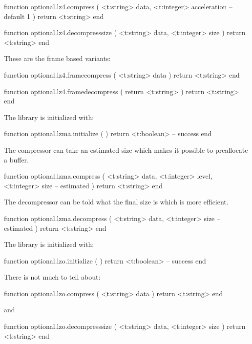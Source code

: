 \starttyping[option=LUA]
function optional.lz4.compress (
    <t:string>  data,
    <t:integer> acceleration -- default 1
)
    return <t:string>
end

function optional.lz4.decompresssize (
    <t:string>  data,
    <t:integer> size
)
    return <t:string>
end
\stoptyping

These are the frame based variants:

\starttyping[option=LUA]
function optional.lz4.framecompress ( <t:string> data )
    return <t:string>
end

function optional.lz4.framedecompress ( return <t:string>  )
    return <t:string>
end
\stoptyping

\stopsubsubsubject

\startsubsubsubject[title=lzma]

The library is initialized with:

\starttyping[option=LUA]
function optional.lzma.initialize ( )
    return <t:boolean> -- success
end
\stoptyping

The compressor can take an estimated size which makes it possible to preallocate
a buffer.

\starttyping[option=LUA]
function optional.lzma.compress (
    <t:string>  data,
    <t:integer> level,
    <t:integer> size   -- estimated
)
    return <t:string>
end
\stoptyping

The decompressor can be told what the final size is which is more efficient.

\starttyping[option=LUA]
function optional.lzma.decompress (
    <t:string>  data,
    <t:integer> size   -- estimated
)
    return <t:string>
end
\stoptyping

\stopsubsubsubject

\startsubsubsubject[title=lzo]

The library is initialized with:

\starttyping[option=LUA]
function optional.lzo.initialize ( )
    return <t:boolean> -- success
end
\stoptyping

There is not much to tell about:

\starttyping[option=LUA]
function optional.lzo.compress ( <t:string> data )
    return <t:string>
end
\stoptyping

and

\starttyping[option=LUA]
function optional.lzo.decompresssize (
    <t:string>  data,
    <t:integer> size
)
    return <t:string>
end
\stoptyping

\stopsubsubsubject


